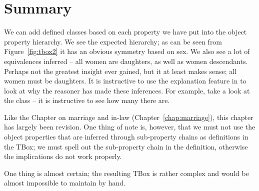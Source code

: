 \section{Summary}

We can add defined classes based on each property we have put into the object property hierarchy. We see the expected hierarchy; as can be seen from Figure~\ref{fig:tbox2} it has an obvious symmetry based on sex. We also see a lot of equivalences inferred -- all women are daughters, as well as women descendants. Perhaps not the greatest insight ever gained, but it at least makes sense; all women must be daughters. It is instructive to use the explanation feature in \protege to look at why the reasoner has made these inferences. For example, take a look at the class  -- it is instructive to see how many there are.

Like the Chapter on marriage and in-law (Chapter~\ref{chap:marriage}), this chapter has largely been revision. One thing of note is, however, that we must not use the object properties that are inferred through sub-property chains as definitions in the TBox; we must spell out the sub-property chain in the definition, otherwise the implications do not work properly.

One thing is almost certain; the resulting TBox is rather complex and would be almost impossible to maintain by hand.
\\

